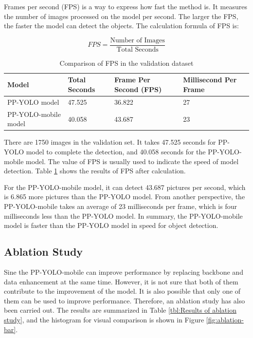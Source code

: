 \documentclass[sensors,article,submit,moreauthors,pdftex]{Definitions/mdpi}
\begin{document}
Frames per second (FPS) is a way to express how fast the method is. It measures the number of images processed on the model per second. The larger the FPS, the faster the model can detect the objects. The calculation formula of FPS is:

\begin{equation} 
{FPS} = \frac {\text{Number\ of\ Images}} {\text{Total\ Seconds}}
\end{equation}

\begin{table}[htbp]
\centering
\caption{Comparison of FPS in the validation dataset}
\begin{tabular}{llll} 
\toprule
\textbf{Model}&\textbf{Total Seconds}&\textbf{Frame Per Second (FPS)}&\textbf{Millisecond Per Frame}\\
\midrule
PP-YOLO model & 47.525&36.822&27\\
PP-YOLO-mobile model&40.058&43.687&23\\
\bottomrule
\end{tabular}
\label{tbl:Comparison of FPS in the validation dataset}
\end{table}

There are 1750 images in the validation set. It takes 47.525 seconds for PP-YOLO model to complete the detection, and 40.058 seconds for the PP-YOLO-mobile model. The value of FPS is usually used to indicate the speed of model detection. Table \ref{tbl:Comparison of FPS in the validation dataset} shows the results of FPS after calculation.

For the PP-YOLO-mobile model, it can detect 43.687 pictures per second, which is 6.865 more pictures than the PP-YOLO model. From another perspective, the PP-YOLO-mobile takes an average of 23 milliseconds per frame, which is four milliseconds less than the PP-YOLO model. In summary, the PP-YOLO-mobile model is faster than the PP-YOLO model in speed for object detection.



\subsection{Ablation Study}

Sine the PP-YOLO-mobile can improve performance by replacing backbone and data enhancement at the same time. However, it is not sure that both of them contribute to the improvement of the model. It is also possible that only one of them can be used to improve performance. Therefore, an ablation study has also been carried out. The results are summarized in Table \ref{tbl:Results of ablation study}, and the histogram for visual comparison is shown in Figure \ref{fig:ablation-bar}.
\end{document}
